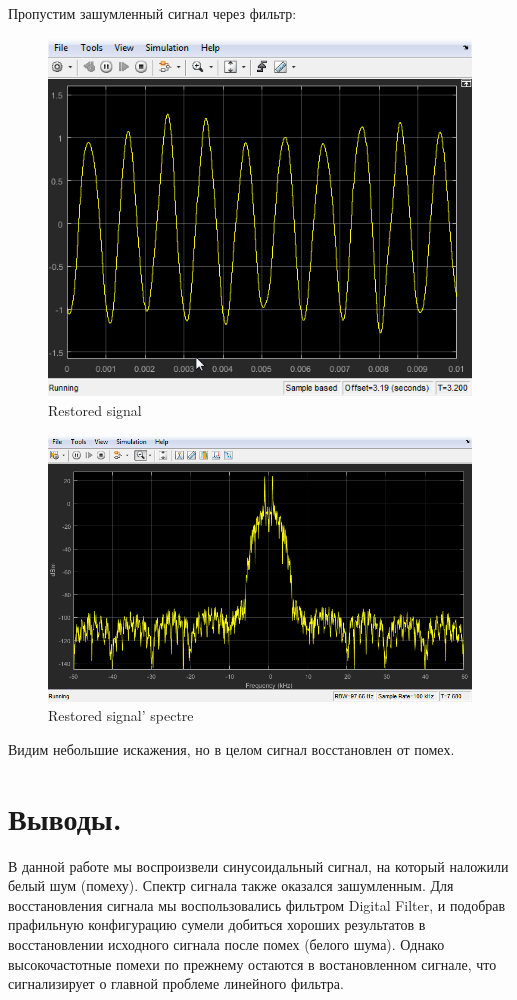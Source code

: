 \documentclass[a4paper,14pt]{extarticle}
\begin{document}
Пропустим зашумленный сигнал через фильтр:
\begin{figure}[H]
    \centering
    \includegraphics{restored}
	\captionsetup{justification=centering,margin=1cm}
    \caption{Restored signal}
    \label{fig:restored}
\end{figure}

\begin{figure}[H]
    \centering
    \includegraphics{restored_sp}
	\captionsetup{justification=centering,margin=1cm}
    \caption{Restored signal' spectre}
    \label{fig:restored_sp}
\end{figure}
Видим небольшие искажения, но в целом сигнал восстановлен от помех.

\section{Выводы.}

В данной работе мы воспроизвели синусоидальный сигнал, на который наложили белый шум (помеху). Спектр сигнала также оказался зашумленным. Для восстановления сигнала мы воспользовались фильтром Digital Filter, и подобрав прафильную конфигурацию сумели добиться хороших результатов в восстановлении исходного сигнала после помех (белого шума). Однако высокочастотные помехи по прежнему остаются в востановленном сигнале, что сигнализирует о главной проблеме линейного фильтра.
\end{document}
